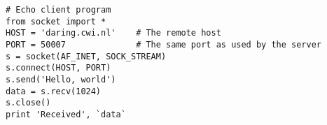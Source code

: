 \bcode\begin{verbatim}
# Echo client program
from socket import *
HOST = 'daring.cwi.nl'    # The remote host
PORT = 50007              # The same port as used by the server
s = socket(AF_INET, SOCK_STREAM)
s.connect(HOST, PORT)
s.send('Hello, world')
data = s.recv(1024)
s.close()
print 'Received', `data`
\end{verbatim}\ecode

